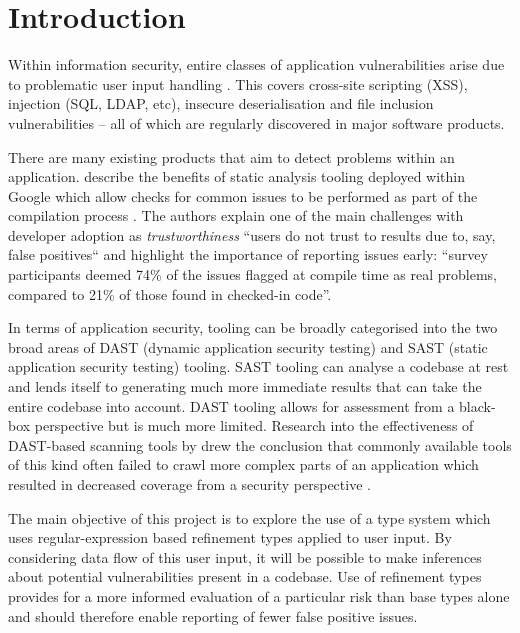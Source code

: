 \documentclass[a4paper]{article}
\title{}
\author{}
\begin{document}
    
    
    \section*{Introduction}
    
    Within information security, entire classes of application vulnerabilities arise due to problematic user input handling \citep{christey2007vulnerability}. This covers cross-site scripting (XSS), injection (SQL, LDAP, etc), insecure
    deserialisation and file inclusion vulnerabilities -- all of which are regularly discovered in major software products.
    
    There are many existing products that aim to detect problems within an application. \citeauthor{Sadowski:2018:LBS:3200906.3188720} describe the benefits of static analysis tooling deployed within Google which allow checks for common issues to be performed as part of the compilation process \citeyearpar{Sadowski:2018:LBS:3200906.3188720}. The authors explain one of the main challenges with developer adoption as \emph{trustworthiness} ``users do not trust to results due to, say, false positives`` and highlight the importance of reporting issues early: ``survey participants deemed 74\% of the issues flagged at compile time as real problems, compared to 21\% of those found in checked-in code''.
    
    In terms of application security, tooling can be broadly categorised into the two broad areas of DAST (dynamic application security testing) and SAST (static application security testing) tooling. SAST tooling can analyse a codebase at rest and lends itself to generating much more immediate results that can take the entire codebase into account. DAST tooling allows for assessment from a black-box perspective but is much more limited. Research into the effectiveness of DAST-based scanning tools by \citeauthor{doupe2010johnny} drew the conclusion that commonly available tools of this kind often failed to crawl more complex parts of an application which resulted in decreased coverage from a security perspective \citeyearpar{doupe2010johnny}.
    
    The main objective of this project is to explore the use of a type system which uses regular-expression based refinement types applied to user input. By considering data flow of this user input, it will be possible to make inferences about potential vulnerabilities present in a codebase. Use of refinement types provides for a more informed evaluation of a particular risk than base types alone and should therefore enable reporting of fewer false positive issues.
    
\end{document}
